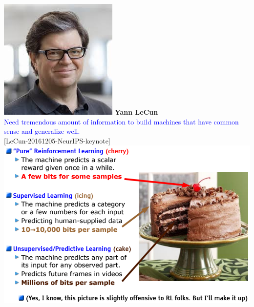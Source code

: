 \begin{frame}{}
    \begin{columns}
            \centering
            \includegraphics[width=0.8\linewidth]{images/dul/slide_16_2_img.png}
            \textbf{Yann LeCun}\\[1em]
            \textcolor{blue}{Need tremendous amount of information to build machines that have common sense and generalize well.}\\[1em]
            [LeCun-20161205-NeurIPS-keynote]
            \includegraphics[width=1.05\linewidth]{images/dul/slide_16_1_img.png}
    \end{columns}
\end{frame}

